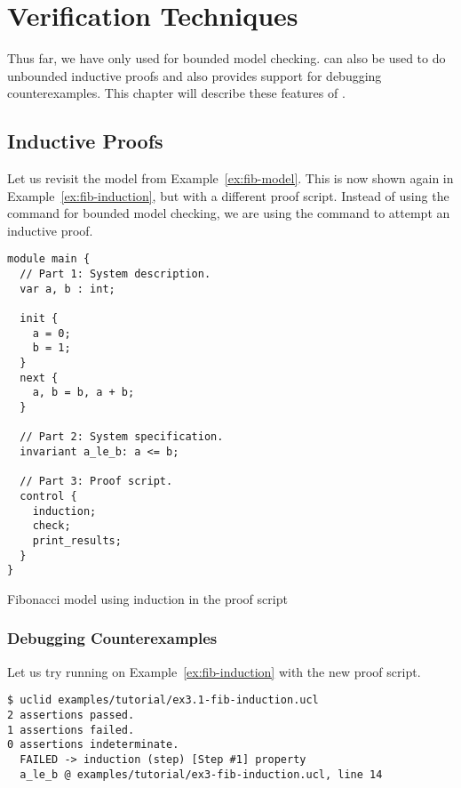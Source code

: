 \chapter{Verification Techniques}

Thus far, we have only used \uclid{} for bounded model checking. \uclid{} can also be used to do unbounded inductive proofs and also provides support for debugging counterexamples. This chapter will describe these features of \uclid{}.

\section{Inductive Proofs}
Let us revisit the model from Example~\ref{ex:fib-model}. This is now shown again in Example~\ref{ex:fib-induction}, but with a different proof script. Instead of using the  command for bounded model checking, we are using the  command to attempt an inductive proof.

\begin{uclidlisting}[htbp]
\begin{lstlisting}[language=uclid,style=uclidstyle]
module main {
  // Part 1: System description.
  var a, b : int;

  init {
    a = 0;
    b = 1;
  }
  next {
    a, b = b, a + b;
  }

  // Part 2: System specification.
  invariant a_le_b: a <= b;

  // Part 3: Proof script.
  control {
    induction;
    check;
    print_results;
  }
}
\end{lstlisting}
\label{ex:fib-induction}
\caption{\uclid{} Fibonacci model using induction in the proof script}
\end{uclidlisting}

\subsection{Debugging Counterexamples}

Let us try running \uclid{} on Example~\ref{ex:fib-induction} with the new proof script.
\begin{Verbatim}[frame=single, samepage=true]
$ uclid examples/tutorial/ex3.1-fib-induction.ucl 
2 assertions passed.
1 assertions failed.
0 assertions indeterminate.
  FAILED -> induction (step) [Step #1] property 
  a_le_b @ examples/tutorial/ex3-fib-induction.ucl, line 14
\end{Verbatim}

